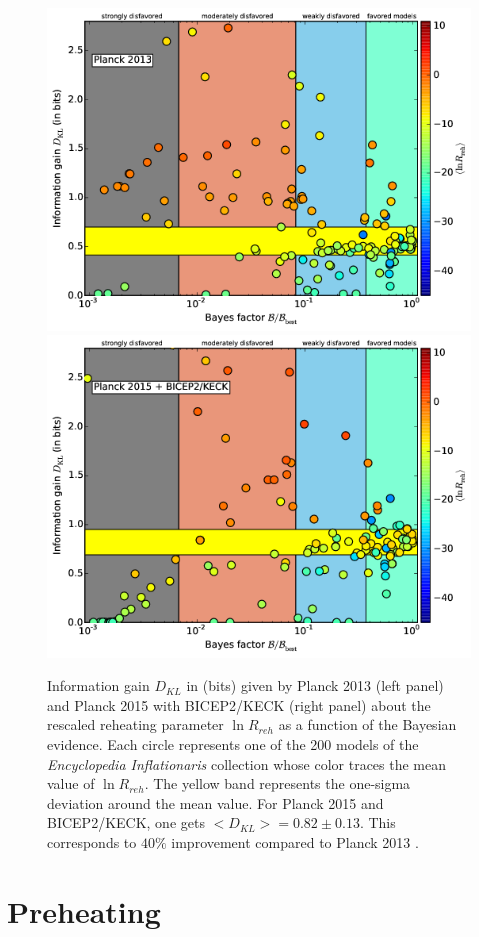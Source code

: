 \documentclass[11pt,a4paper,twoside]{book}
\begin{document}
\begin{figure}[h]
	\centering
	\includegraphics[width=0.75\linewidth, height=0.3\textheight]{Images/Chap3/Martin_Fig3A}
	\includegraphics[width=0.75\linewidth, height=0.3\textheight]{Images/Chap3/Martin_Fig3B}
	\caption{Information gain $ D_{KL} $ in (bits) given by Planck 2013 (left panel) and Planck 2015 with BICEP2/KECK (right panel) about the rescaled reheating parameter $ \ln R_{reh} $ as a function of the Bayesian evidence. Each circle represents one of the 200 models of the \textit{Encyclopedia Inflationaris} collection whose color traces the mean value of $ \ln R_{reh} $. The yellow band represents the one-sigma deviation around the mean value. For Planck 2015 and BICEP2/KECK, one gets $ <D_{KL}> = 0.82 \pm 0.13 $. This corresponds to $ 40\% $ improvement compared to Planck 2013 \cite{Chap3:Martin_Milestone}. } 
	\label{fig:martinfig3a}
\end{figure}
\chapter{Preheating}
\end{document}
